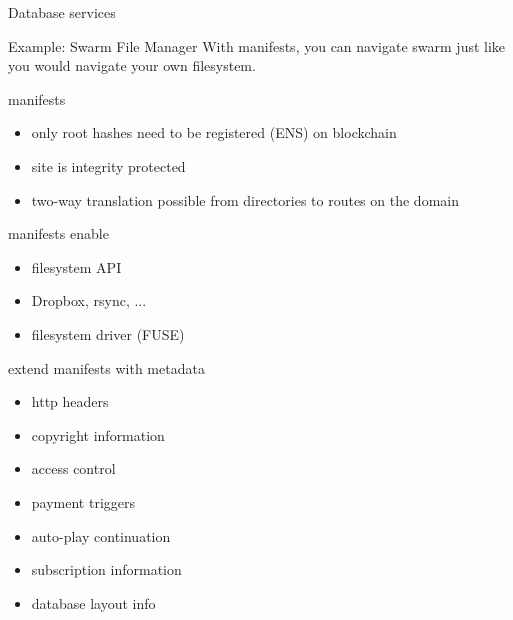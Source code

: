 \documentclass{beamer}
\begin{document}
\begin{section}{Database services}
 \begin{frame}{Example: Swarm File Manager}
  With manifests, you can navigate swarm just like you would navigate your own filesystem.\\
 \end{frame}

\begin{frame}{}
\begin{block}{manifests}
\begin{itemize}
 \item only root hashes need to be registered (ENS) on blockchain
 \item site is integrity protected
 \item two-way translation possible from directories to routes on the domain
  \end{itemize}
\end{block}
\begin{block}{manifests enable}
  \begin{itemize}
   \item filesystem API
   \item Dropbox, rsync, ...
   \item filesystem driver (FUSE)
  \end{itemize}
  \end{block}
\end{frame}


\begin{frame}{}
\begin{block}{extend manifests with metadata}
\begin{itemize}
      \item http headers
      \item copyright information
      \item access control
      \item payment triggers
      \item auto-play continuation
      \item subscription information
      \item database layout info
\end{itemize}
\end{block}



\end{frame}
\end{section}
\end{document}
